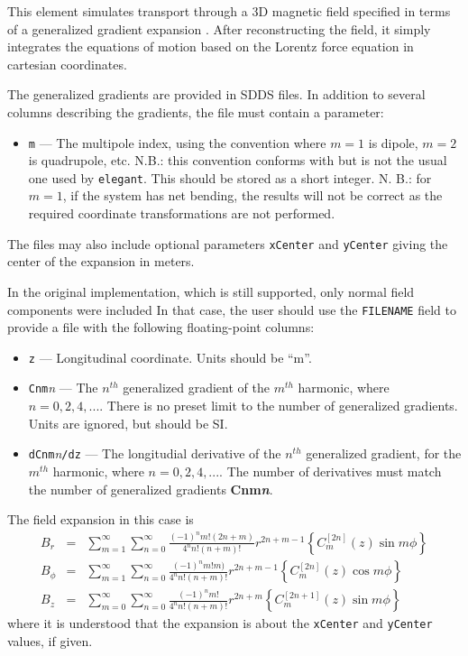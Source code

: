 This element simulates transport through a 3D magnetic field
specified in terms of a generalized gradient expansion \cite{Venturini-NIMA427-387}.
After reconstructing the field, it simply integrates the equations of motion
based on the Lorentz force equation in cartesian coordinates.  

The generalized gradients are provided in SDDS files.
In addition to several columns describing the gradients, the file must contain a parameter:
\begin{itemize}
\item \verb|m| --- The multipole index, using the convention where $m=1$ is dipole, $m=2$ is quadrupole,
  etc. N.B.: this convention conforms with \cite{Venturini-NIMA427-387} but is not the usual one used by
  {\tt elegant}. This should be stored as a short integer.
  N. B.: for $m=1$, if the system has net bending, the results will not be correct as the required coordinate
  transformations are not performed.
\end{itemize}
The files may also include optional parameters \verb|xCenter| and \verb|yCenter| giving the center of the expansion
in meters.

In the original implementation, which is still supported, only normal field components were included
In that case, the user should use the \verb|FILENAME| field to provide a file 
with the following floating-point columns:
\begin{itemize}
\item \verb|z| --- Longitudinal coordinate. Units should be ``m''.
\item \verb|Cnm|{\em n} --- The $n^{th}$ generalized gradient of the $m^{th}$ harmonic, where $n=0,2,4,...$.
  There is no preset limit to the number of generalized gradients. Units are ignored,
  but should be SI.
\item \verb|dCnm|{\em n}\verb|/dz| --- The longitudial derivative of the $n^{th}$ generalized gradient, 
  for the $m^{th}$ harmonic, where $n=0,2,4,...$.
  The number of derivatives must match the number of generalized gradients {\bf Cnm{\em n}}.
\end{itemize}
The field expansion in this case is
\begin{equation}
\begin{array}{lcl}
B_r & = & \sum\limits_{m=1}^\infty \sum\limits_{n=0}^\infty \frac{(-1)^n m! (2n + m)}{4^n n! (n+m)!} r^{2 n + m-1}
\left\{C_m^{\left[2n\right]}(z) \sin m\phi\right\}  \\
B_\phi & = & \sum\limits_{m=1}^\infty \sum\limits_{n=0}^\infty \frac{(-1)^n m! m)}{4^n n! (n+m)!} r^{2 n + m-1}
\left\{C_m^{\left[2n\right]}(z) \cos m\phi\right\} \\
B_z & = & \sum\limits_{m=0}^\infty \sum\limits_{n=0}^\infty \frac{(-1)^n m!}{4^n n! (n+m)!} r^{2 n + m}
\left\{C_m^{\left[2n+1\right]}(z) \sin m\phi\right\}
\end{array}
\end{equation}
where it is understood that the expansion is about the {\tt xCenter} and {\tt yCenter} values, if given.


